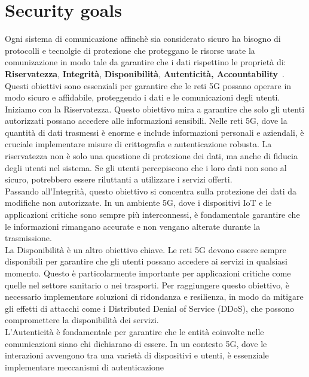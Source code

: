 \documentclass[english]{article}
\begin{document}
\section{Security goals}\label{sec:SecurityGoal}
Ogni sistema di comunicazione affinchè sia considerato sicuro ha bisogno di
protocolli e tecnolgie di protezione che proteggano le risorse usate la
comunizazione in modo tale da garantire che i dati rispettino le proprietà di:
\textbf{Riservatezza}, \textbf{Integrità}, \textbf{Disponibilità},
\textbf{Autenticità, \textbf{Accountability}}~\cite{mohan2022cyber}. \\ Questi
obiettivi sono essenziali per garantire che le reti 5G possano operare in modo
sicuro e affidabile, proteggendo i dati e le comunicazioni degli utenti. \\
Iniziamo con la Riservatezza. Questo obiettivo mira a garantire che solo gli
utenti autorizzati possano accedere alle informazioni sensibili. Nelle reti 5G,
dove la quantità di dati trasmessi è enorme e include informazioni personali e
aziendali, è cruciale implementare misure di crittografia e autenticazione
robusta. La riservatezza non è solo una questione di protezione dei dati, ma
anche di fiducia degli utenti nel sistema. Se gli utenti percepiscono che i
loro dati non sono al sicuro, potrebbero essere riluttanti a utilizzare i
servizi offerti. \\ Passando all'Integrità, questo obiettivo si concentra sulla
protezione dei dati da modifiche non autorizzate. In un ambiente 5G, dove i
dispositivi IoT e le applicazioni critiche sono sempre più interconnessi, è
fondamentale garantire che le informazioni rimangano accurate e non vengano
alterate durante la trasmissione. \\ La Disponibilità è un altro obiettivo
chiave. Le reti 5G devono essere sempre disponibili per garantire che gli
utenti possano accedere ai servizi in qualsiasi momento. Questo è
particolarmente importante per applicazioni critiche come quelle nel settore
sanitario o nei trasporti. Per raggiungere questo obiettivo, è necessario
implementare soluzioni di ridondanza e resilienza, in modo da mitigare gli
effetti di attacchi come i Distributed Denial of Service (DDoS), che possono
compromettere la disponibilità dei servizi. \\ L'Autenticità è fondamentale per
garantire che le entità coinvolte nelle comunicazioni siano chi dichiarano di
essere. In un contesto 5G, dove le interazioni avvengono tra una varietà di
dispositivi e utenti, è essenziale implementare meccanismi di autenticazione
\end{document}
